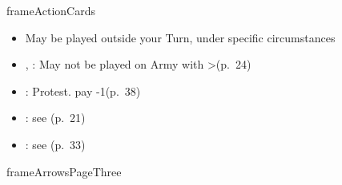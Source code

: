 \documentclass[10pt]{article}
\newlength{\fhActionCards} \setlength\fhActionCards{15\baselineskip}
\begin{document}
\begin{dynamiccontents*}{frameActionCards}
\begin{eubox}{\fhActionCards}
\begin{multicols}{2}
\begin{itemize}
			\item May be played outside your Turn, under specific circumstances
		\end{itemize}
		\begin{itemize}
			\item {}, : May not be played on Army with \artillery>\cavalry (p.~24)
			\item {}: Protest. pay -1\adminpower (p.~38)
			\item {}: see  (p.~21)
			\item {}: see  (p.~33)
		\end{itemize}
	\end{multicols}
\end{eubox}\end{dynamiccontents*}

\begin{dynamiccontents*}{frameArrowsPageThree}
\end{dynamiccontents*}
\end{document}
